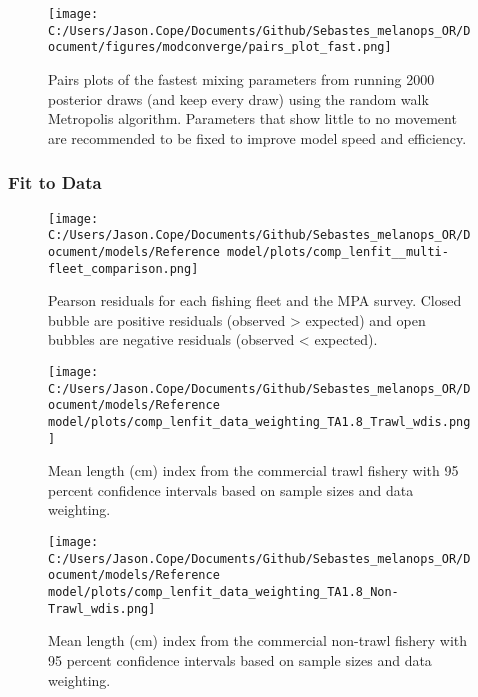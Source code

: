\documentclass[11pt,
  letterpaper,
]{article}
\begin{document}
\newpage

\begin{figure}
{\centering
\texttt{[image: C:/Users/Jason.Cope/Documents/Github/Sebastes\_melanops\_OR/Document/figures/modconverge/pairs\_plot\_fast.png]}
}
\caption{Pairs plots of the fastest mixing parameters from running 2000 posterior draws (and keep every draw) using the random walk Metropolis algorithm. Parameters that show little to no movement are recommended to be fixed to improve model speed and efficiency.\label{fig:pairs-plot-fast}}
\end{figure}

\clearpage

\hypertarget{fit-to-data}{%
\subsubsection{Fit to Data}\label{fit-to-data}}

\begin{figure}
{\centering
\texttt{[image: C:/Users/Jason.Cope/Documents/Github/Sebastes\_melanops\_OR/Document/models/Reference model/plots/comp\_lenfit\_\_multi-fleet\_comparison.png]}
}
\caption{Pearson residuals for each fishing fleet and the MPA survey. Closed bubble are positive residuals (observed > expected) and open bubbles are negative residuals (observed < expected).\label{fig:lt-pearson-resids}}
\end{figure}

\newpage

\begin{figure}
{\centering
\texttt{[image: C:/Users/Jason.Cope/Documents/Github/Sebastes\_melanops\_OR/Document/models/Reference model/plots/comp\_lenfit\_data\_weighting\_TA1.8\_Trawl\_wdis.png]}
}
\caption{Mean length (cm) index from the commercial trawl fishery with 95 percent confidence intervals based on sample sizes and data weighting.\label{fig:trawl-mean-len-fit}}
\end{figure}

\newpage

\begin{figure}
{\centering
\texttt{[image: C:/Users/Jason.Cope/Documents/Github/Sebastes\_melanops\_OR/Document/models/Reference model/plots/comp\_lenfit\_data\_weighting\_TA1.8\_Non-Trawl\_wdis.png]}
}
\caption{Mean length (cm) index from the commercial non-trawl fishery with 95 percent confidence intervals based on sample sizes and data weighting.\label{fig:nontrawl-mean-len-fit}}
\end{figure}
\end{document}
